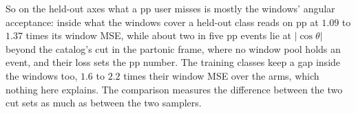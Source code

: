 \documentclass[11pt]{article}
\begin{document}
So on the held-out axes what a pp user misses is mostly the windows' angular acceptance: inside what the windows cover
a held-out class reads on pp at $1.09$ to $1.37$ times its window MSE, while about two in five pp events lie at
$|\cos\theta|$ beyond the catalog's cut in the partonic frame, where no window pool holds an event, and their loss sets
the pp number. The training classes keep a gap inside the windows too, $1.6$ to $2.2$ times their window MSE over the
arms, which nothing here explains. The comparison measures the difference between the two cut sets as much as between the
two samplers.

\end{document}
